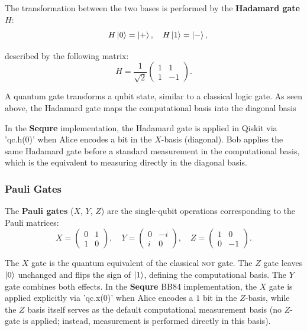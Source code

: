 \documentclass[12pt, a4paper]{article}
\begin{document}
The transformation between the two bases is performed by the
\textbf{Hadamard gate $H$}:
\begin{equation*}
  \quad H\ket{0} = \ket{+}, \quad H\ket{1} = \ket{-},
  \label{eq:hadamard}
\end{equation*}

described by the following matrix: \begin{equation*}
  H = \frac{1}{\sqrt{2}}\begin{pmatrix} 1 & 1 \\ 1 & -1 \end{pmatrix}.
  \label{eq:hadamard}
\end{equation*}


A quantum gate transforms a qubit state, similar to a classical logic gate. As seen above, the Hadamard gate maps the computational basis into the diagonal basis

In the \textbf{Sequre} implementation, the Hadamard gate is applied in Qiskit via 'qc.h(0)' when Alice encodes a bit in the $X$-basis (diagonal). Bob applies the same Hadamard gate before a standard measurement in the computational basis, which is the equivalent to measuring directly in the diagonal basis.

\subsubsection{Pauli Gates}

The \textbf{Pauli gates} ($X$, $Y$, $Z$) are the 
single-qubit operations corresponding to the Pauli matrices:
\begin{equation*}
  X = \begin{pmatrix} 0 & 1 \\ 1 & 0 \end{pmatrix}, \quad
  Y = \begin{pmatrix} 0 & -i \\ i & 0 \end{pmatrix}, \quad
  Z = \begin{pmatrix} 1 & 0 \\ 0 & -1 \end{pmatrix}.
\end{equation*}

The $X$ gate is the quantum equivalent of the classical \textsc{not}
gate. The $Z$ gate
leaves $\ket{0}$ unchanged and flips the sign of $\ket{1}$, defining
the computational basis. The $Y$ gate combines both effects. In
the \textbf{Sequre} BB84 implementation, the $X$ gate is applied
explicitly via 'qc.x(0)' when Alice encodes a $1$ bit in the
$Z$-basis, while the $Z$ basis itself serves as the default
computational measurement basis (no $Z$-gate is applied; instead, measurement is performed directly in this basis).
\end{document}
